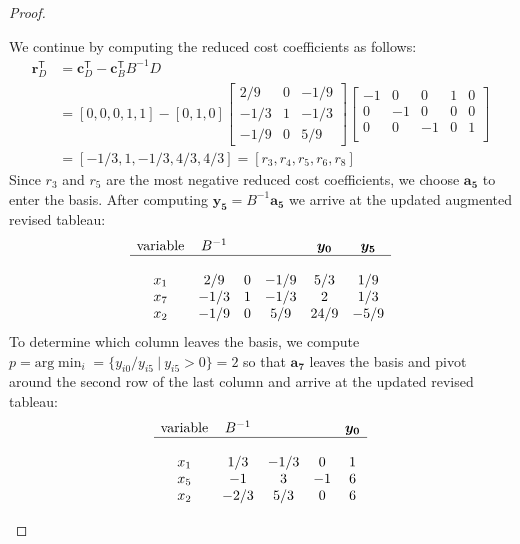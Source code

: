 \documentclass[12pt]{article}
\theoremstyle{definition}
\newcommand{\vect}[1]{\boldsymbol{#1}}
\newcommand{\tran}{\mathsf{T}}
\begin{document}
\begin{proof}
\begin{enumerate}
      We continue by computing the reduced cost coefficients as follows:
      \begin{align*}
        \vect{r}_D^\tran &= \vect{c}_D^\tran - \vect{c}_B^\tran B^{-1} D \\
        &= [0, 0, 0, 1, 1] - [0, 1, 0]
        \begin{bmatrix}
          2/9 & 0 & -1/9 \\
          -1/3 & 1 & -1/3\\
          -1/9 & 0 & 5/9
        \end{bmatrix}
        \begin{bmatrix}
          -1 & 0 & 0 & 1 & 0\\
          0 & -1 & 0 & 0 & 0\\
          0 & 0 & -1 & 0 & 1\\
        \end{bmatrix} \\
        &= [-1/3, 1, -1/3, 4/3, 4/3] = [r_3, r_4, r_5, r_6, r_8]
      \end{align*}
      Since $r_3$ and $r_5$ are the most negative reduced cost coefficients, we choose $\vect{a_5}$
      to enter the basis. After computing $\vect{y_5} = B^{-1}\vect{a_5}$ we
      arrive at the updated augmented revised tableau:
      \begin{align*}
        \begin{matrix}
          \text{variable} & B^{-1} & & & \vect{y_0} & \vect{y_5}\\
          \hline \\
          x_1 & 2/9 & 0 & -1/9 & 5/3 & 1/9\\
          x_7 & -1/3 & 1 & -1/3 & 2 & 1/3\\
          x_2 & -1/9 & 0 & 5/9 & 24/9 & -5/9\\
        \end{matrix}
      \end{align*}
      To determine which column leaves the basis, we compute
      $p = \text{arg}\min_i = \{y_{i0} / y_{i5} \ | \ y_{i5} > 0\} = 2$ so that $\vect{a_7}$
      leaves the basis and pivot
      around the second row of the last column and arrive at the updated revised tableau:
      \begin{align*}
        \begin{matrix}
          \text{variable} & B^{-1} & & & \vect{y_0}\\
          \hline \\
          x_1 & 1/3 & -1/3 & 0 & 1\\
          x_5 & -1 & 3 & -1 & 6\\
          x_2 & -2/3 & 5/3 & 0 & 6\\
        \end{matrix}
      \end{align*}


\end{enumerate}
\end{proof}
\end{document}
